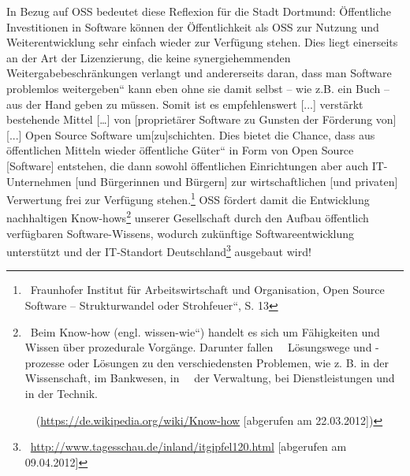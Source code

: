 \documentclass[a4paper]{article}
\begin{document}
{
In Bezug auf OSS bedeutet diese Reflexion f\"ur die Stadt Dortmund:
\"Offentliche Investitionen in Software k\"onnen der \"Offentlichkeit
als OSS zur Nutzung und Weiterentwicklung sehr einfach wieder zur
Verf\"ugung stehen. Dies liegt einerseits an der Art der Lizenzierung,
die keine synergiehemmenden Weitergabebeschr\"ankungen verlangt und
andererseits daran, dass man Software problemlos
{\quotedblbase}weitergeben{\textquotedblleft} kann eben ohne sie damit
selbst -- wie z.B. ein Buch -- aus der Hand geben zu m\"ussen. Somit
ist es empfehlenswert {\guillemotright} [...] verst\"arkt bestehende
Mittel [{\dots}] von [propriet\"arer Software zu Gunsten der
F\"orderung von] [...] Open Source Software um[zu]schichten. Dies
bietet die Chance, dass aus \"offentlichen Mitteln wieder
{\quotedblbase}\"offentliche G\"uter{\textquotedblleft} in Form von
Open Source [Software] entstehen, die dann sowohl \"offentlichen
Einrichtungen aber auch IT-Unternehmen [und B\"urgerinnen und
B\"urgern] zur wirtschaftlichen [und privaten] Verwertung frei zur
Verf\"ugung stehen.{\guillemotleft}\footnote{\ Fraunhofer Institut
f\"ur Arbeitswirtschaft und Organisation, {\quotedblbase}Open Source
Software -- Strukturwandel oder Strohfeuer{\textquotedblleft}, S. 13}
OSS f\"ordert damit die Entwicklung nachhaltigen
Know-hows\footnote{\ {\guillemotright}Beim Know-how (engl.
{\quotedblbase}wissen-wie{\textquotedblleft}) handelt es sich um
F\"ahigkeiten und Wissen \"uber prozedurale Vorg\"ange. Darunter fallen
\ \ L\"osungswege und {}-prozesse oder L\"osungen zu den
verschiedensten Problemen, wie z. B. in der Wissenschaft, im Bankwesen,
in \ \ der Verwaltung, bei Dienstleistungen und in der
Technik.{\guillemotleft}\par
\ \ (\url{https://de.wikipedia.org/wiki/Know-how} [abgerufen am
22.03.2012])} unserer Gesellschaft durch den Aufbau \"offentlich
verf\"ugbaren Software-Wissens, wodurch zuk\"unftige
Softwareentwicklung unterst\"utzt und der IT-Standort
Deutschland\footnote{\ \url{http://www.tagesschau.de/inland/itgipfel120.html}
[abgerufen am 09.04.2012]} ausgebaut wird!}
\end{document}
